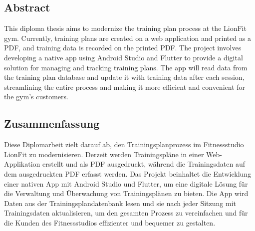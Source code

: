 \begin{spacing}{1}
    \chapter*{Abstract}
\end{spacing}
This diploma thesis aims to modernize the training plan process at the LionFit gym. 
Currently, training plans are created on a web application and printed as a PDF, and training data 
is recorded on the printed PDF. The project involves developing a native app using Android Studio and Flutter 
to provide a digital solution for managing and tracking training plans. The app will read data from the training 
plan database and update it with training data after each session, streamlining the entire process and making it 
more efficient and convenient for the gym's customers.
\newpage
{}
\begin{spacing}{1}
    \chapter*{Zusammenfassung}
\end{spacing}
Diese Diplomarbeit zielt darauf ab, den Trainingsplanprozess im Fitnessstudio LionFit zu modernisieren. 
Derzeit werden Trainingspläne in einer Web-Applikation erstellt und als PDF ausgedruckt, 
während die Trainingsdaten auf dem ausgedruckten PDF erfasst werden. Das Projekt beinhaltet 
die Entwicklung einer nativen App mit Android Studio und Flutter, um eine digitale Lösung für 
die Verwaltung und Überwachung von Trainingsplänen zu bieten. Die App wird Daten aus der 
Trainingsplandatenbank lesen und sie nach jeder Sitzung mit Trainingsdaten aktualisieren, 
um den gesamten Prozess zu vereinfachen und für die Kunden des Fitnessstudios effizienter und bequemer zu gestalten.

